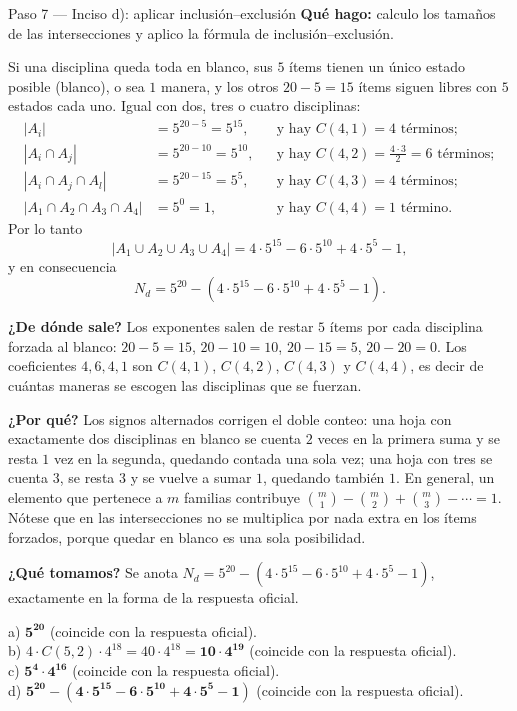 \documentclass[11pt]{article}
\begin{document}
\begin{paso}{Paso 7 --- Inciso d): aplicar inclusión--exclusión}
\textbf{Qué hago:} calculo los tamaños de las intersecciones y aplico la fórmula de inclusión--exclusión.

Si una disciplina queda toda en blanco, sus $5$ ítems tienen un único estado posible (blanco), o sea $1$ manera, y los otros $20-5=15$ ítems siguen libres con $5$ estados cada uno. Igual con dos, tres o cuatro disciplinas:
\begin{align*}
  |A_i| &= 5^{20-5}=5^{15}, &&\text{y hay } C(4,1)=4 \text{ términos};\\
  |A_i\cap A_j| &= 5^{20-10}=5^{10}, &&\text{y hay } C(4,2)=\tfrac{4\cdot 3}{2}=6 \text{ términos};\\
  |A_i\cap A_j\cap A_l| &= 5^{20-15}=5^{5}, &&\text{y hay } C(4,3)=4 \text{ términos};\\
  |A_1\cap A_2\cap A_3\cap A_4| &= 5^{0}=1, &&\text{y hay } C(4,4)=1 \text{ término}.
\end{align*}
Por lo tanto
\[
  |A_1\cup A_2\cup A_3\cup A_4| = 4\cdot 5^{15} - 6\cdot 5^{10} + 4\cdot 5^{5} - 1 ,
\]
y en consecuencia
\[
  N_d = 5^{20} - \left(4\cdot 5^{15} - 6\cdot 5^{10} + 4\cdot 5^{5} - 1\right).
\]

\textbf{¿De dónde sale?} Los exponentes salen de restar $5$ ítems por cada disciplina forzada al blanco: $20-5=15$, $20-10=10$, $20-15=5$, $20-20=0$. Los coeficientes $4,6,4,1$ son $C(4,1)$, $C(4,2)$, $C(4,3)$ y $C(4,4)$, es decir de cuántas maneras se escogen las disciplinas que se fuerzan.

\textbf{¿Por qué?} Los signos alternados corrigen el doble conteo: una hoja con exactamente dos disciplinas en blanco se cuenta $2$ veces en la primera suma y se resta $1$ vez en la segunda, quedando contada una sola vez; una hoja con tres se cuenta $3$, se resta $3$ y se vuelve a sumar $1$, quedando también $1$. En general, un elemento que pertenece a $m$ familias contribuye $\binom{m}{1}-\binom{m}{2}+\binom{m}{3}-\cdots=1$. Nótese que en las intersecciones no se multiplica por nada extra en los ítems forzados, porque quedar en blanco es una sola posibilidad.

\textbf{¿Qué tomamos?} Se anota $N_d=5^{20}-(4\cdot 5^{15}-6\cdot 5^{10}+4\cdot 5^5-1)$, exactamente en la forma de la respuesta oficial.
\end{paso}

\begin{resp}
a) $\mathbf{5^{20}}$ (coincide con la respuesta oficial).\\
b) $4\cdot C(5,2)\cdot 4^{18}=40\cdot 4^{18}=\mathbf{10\cdot 4^{19}}$ (coincide con la respuesta oficial).\\
c) $\mathbf{5^{4}\cdot 4^{16}}$ (coincide con la respuesta oficial).\\
d) $\mathbf{5^{20}-\left(4\cdot 5^{15}-6\cdot 5^{10}+4\cdot 5^{5}-1\right)}$ (coincide con la respuesta oficial).
\end{resp}
\end{document}
